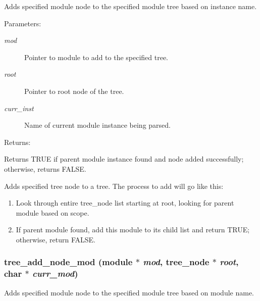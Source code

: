Adds specified module node to the specified module tree based on instance name.

\begin{Desc}
\item[Parameters: ]\par
\begin{description}
\item[{\em 
mod}]Pointer to module to add to the specified tree. \item[{\em 
root}]Pointer to root node of the tree. \item[{\em 
curr\_\-inst}]Name of current module instance being parsed.\end{description}
\end{Desc}
\begin{Desc}
\item[Returns: ]\par
Returns TRUE if parent module instance found and node added successfully; otherwise, returns FALSE.\end{Desc}
Adds specified tree node to a tree. The process to add will go like this:\begin{enumerate}
\item 
Look through entire tree\_\-node list starting at root, looking for parent module based on scope.\item 
If parent module found, add this module to its child list and return TRUE; otherwise, return FALSE. \end{enumerate}
\subsubsection{ tree\_\-add\_\-node\_\-mod ({\bf module} $\ast$ {\em mod}, {\bf tree\_\-node} $\ast$ {\em root}, char $\ast$ {\em curr\_\-mod})}\label{tree_8c_a2}


Adds specified module node to the specified module tree based on module name.

